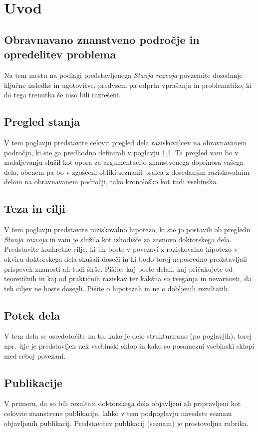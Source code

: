 \chapter{Uvod}\label{cha:uvod}

\section{Obravnavano znanstveno področje in opredelitev problema}\label{sec:predstavitev_problema}
Na tem mestu na podlagi predstavljenega \emph{Stanja razvoja} povzemite dosedanje ključne izsledke in ugotovitve, predvsem pa odprta vprašanja in problematiko, ki do tega trenutka še niso bili razrešeni.

\section{Pregled stanja}\label{sec:pregled_stanja}
V tem poglavju predstavite celovit pregled dela raziskovalcev na obravnavanem področju, ki ste ga predhodno definirali v poglavju \ref{sec:predstavitev_problema}. Ta pregled vam bo v nadaljevanju služil kot opora za argumentacijo znanstvenega doprinosa vašega dela, obenem pa bo v zgoščeni obliki seznanil bralca z dosedanjim raziskovalnim delom na obravnavanem področji, tako kronološko kot tudi vsebinsko.

\section{Teza in cilji}\label{sec:teza}
V tem poglavju predstavite raziskovalno hipotezo, ki ste jo postavili ob pregledu \emph{Stanja razvoja} in vam je služila kot izhodišče za zasnovo doktorskega dela. Predstavite konkretne cilje, ki jih boste v povezavi z raziskovalno hipotezo v okviru doktorskega dela skušali doseči in ki bodo torej neposredno predstavljali prispevek znanosti ali tudi širše. Pišite, kaj boste delali, kaj pričakujete od teoretičnih in kaj od praktičnih raziskav ter kakšna so tveganja in nevarnosti, da teh ciljev ne boste dosegli. Pišite o hipotezah in ne o dobljenih rezultatih.

\section{Potek dela}\label{sec:potek}
V tem delu se osredotočite na to, kako je delo strukturirano (po poglavjih), torej npr.\ kje je predstavljen nek vsebinski sklop in kako so posamezni vsebinski sklopi med seboj povezani.

\section{Publikacije}\label{sec:publikacije}
V primeru, da so bili rezultati doktorskega dela objavljeni ali pripravljeni kot celovite znanstvene publikacije, lahko v tem podpoglavju navedete seznam objavljenih publikacij. Predstavitev publikacij (seznam) je prostovoljna rubrika.





